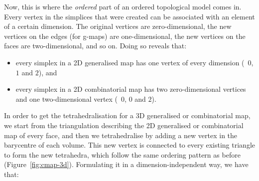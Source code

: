 Now, this is where the \emph{ordered} part of an ordered topological model comes in.
Every vertex in the simplices that were created can be associated with an element of a certain dimension.
The original vertices are zero-dimensional, the new vertices on the edges (for g-maps) are one-dimensional, the new vertices on the faces are two-dimensional, and so on.
Doing so reveals that:

\begin{itemize}
\item every simplex in a 2D generalised map has one vertex of every dimension (\ie\ \(0\), \(1\) and \(2\)), and
\item every simplex in a 2D combinatorial map has two zero-dimensional vertices and one two-di\-men\-sio\-nal vertex (\ie\ \(0\), \(0\) and \(2\)).
\end{itemize}

In order to get the tetrahedralisation for a 3D generalised or combinatorial map, we start from the triangulation describing the 2D generalised or combinatorial map of every face, and then we tetrahedralise by adding a new vertex in the barycentre of each volume.
This new vertex is connected to every existing triangle to form the new tetrahedra, which follow the same ordering pattern as before (Figure~\ref{fig:cmap-3d}).
Formulating it in a dimension-independent way, we have that:

